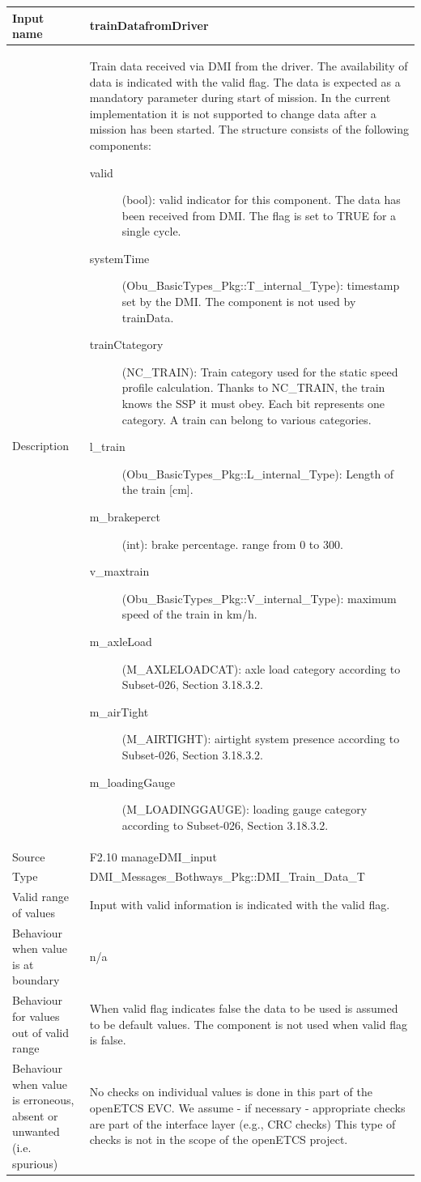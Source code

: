 \begin{longtable}{p{}p{}}
\toprule
Input name				& trainDatafromDriver \\
\midrule
Description				& Train data received via DMI from the driver. The availability of data is indicated with the valid flag. The data is expected as a mandatory parameter during start of mission. In the current implementation it is not supported to change data after a mission has been started. The structure consists of the following components:
\begin{description}
\item[valid](bool): valid indicator for this component. The data has been received from DMI. The flag is set to TRUE for a single cycle. 
\item[systemTime](Obu\_BasicTypes\_Pkg::T\_internal\_Type): timestamp set by the DMI. The component is not used by trainData.
\item[trainCtategory](NC\_TRAIN): Train category used for the static speed profile calculation.
Thanks to NC\_TRAIN, the train knows the SSP it must obey. Each bit represents one category. A train can belong to various categories.
\item[l\_train](Obu\_BasicTypes\_Pkg::L\_internal\_Type): Length of the train [cm].
\item[m\_brakeperct](int): brake percentage. range from 0 to 300.
\item[v\_maxtrain](Obu\_BasicTypes\_Pkg::V\_internal\_Type): maximum speed of the train in km/h.
\item[m\_axleLoad](M\_AXLELOADCAT): axle load category according to Subset-026, Section 3.18.3.2.
\item[m\_airTight](M\_AIRTIGHT): airtight system presence according to Subset-026, Section 3.18.3.2.
\item[m\_loadingGauge](M\_LOADINGGAUGE): loading gauge category according to Subset-026, Section 3.18.3.2.
\end{description} \\

\midrule
Source				& F2.10 manageDMI\_input\\ 
\midrule
Type					& DMI\_Messages\_Bothways\_Pkg::DMI\_Train\_Data\_T \\
\midrule
Valid range of values	& Input with valid information is indicated with the valid flag. \\
\midrule
Behaviour when value is at boundary	& n/a\\
\midrule
Behaviour for values out of valid range	& When valid flag indicates false the data to be used is assumed to be default values. The component is not used when valid flag is false.\\
\midrule
Behaviour when value is erroneous, absent or unwanted (i.e. spurious) & No checks on individual values is done in this part of the openETCS EVC. We assume - if necessary - appropriate checks are part of the interface layer (e.g., CRC checks) This type of checks is not in the scope of the openETCS project.\\
\bottomrule

\end{longtable}

